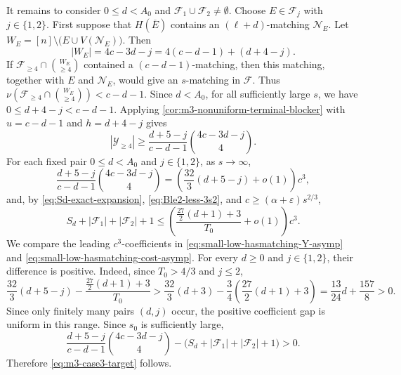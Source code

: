 \documentclass[10pt,a4paper]{article}
\numberwithin{equation}{section}
\theoremstyle{definition}
\newcommand{\F}{\mathcal F}
\newcommand{\Y}{\mathcal Y}
\begin{document}
It remains to consider $0\le d<A_0$ and $\F_1\cup\F_2\ne\emptyset$.
Choose $E\in\F_j$ with $j\in\{1,2\}$.
First suppose that $H(\overline E)$ contains an $(\ell+d)$-matching $\mathcal N_E$.
Let $W_E=[n]\setminus\bigl(E\cup V(\mathcal N_E)\bigr)$.
Then
\[
        |W_E|=4c-3d-j=4(c-d-1)+(d+4-j).
\]
If $\F_{\ge4}\cap\binom {W_E}{\ge4}$ contained a $(c-d-1)$-matching, then this matching, together with $E$ and $\mathcal N_E$, would give an $s$-matching in $\F$.
Thus $\nu\left(\F_{\ge4}\cap\binom {W_E}{\ge4}\right)<c-d-1$.
Since $d<A_0$, for all sufficiently large $s$, we have $0\le d+4-j<c-d-1$.
Applying \cref{cor:m3-nonuniform-terminal-blocker} with $u=c-d-1$ and $h=d+4-j$ gives
\[
        |\Y_{\ge4}|
        \ge
        \frac{d+5-j}{c-d-1}\binom{4c-3d-j}{4}.
\]
For each fixed pair $0\le d<A_0$ and $j\in\{1,2\}$, as $s\to\infty$,
\begin{equation}\label{eq:small-low-hasmatching-Y-asymp}
        \frac{d+5-j}{c-d-1}\binom{4c-3d-j}{4}
        =
        \left(\frac{32}{3}(d+5-j)+o(1)\right)c^3,
\end{equation}
and, by \eqref{eq:Sd-exact-expansion}, \eqref{eq:Ble2-less-3s2}, and $c\ge(\alpha+\varepsilon)s^{2/3}$,
\begin{equation}\label{eq:small-low-hasmatching-cost-asymp}
        S_d+|\F_1|+|\F_2|+1
        \le
        \left(
        \frac{\frac{27}{2}(d+1)+3}{T_0}
        +o(1)
        \right)c^3.
\end{equation}
We compare the leading $c^3$-coefficients in \eqref{eq:small-low-hasmatching-Y-asymp} and \eqref{eq:small-low-hasmatching-cost-asymp}.
For every $d\ge0$ and $j\in\{1,2\}$, their difference is positive.
Indeed, since $T_0>4/3$ and $j\le2$,
\[
        \frac{32}{3}(d+5-j)
        -\frac{\frac{27}{2}(d+1)+3}{T_0}>
        \frac{32}{3}(d+3)
        -\frac34\left(\frac{27}{2}(d+1)+3\right)=\frac{13}{24}d+\frac{157}{8}>0.
\]
Since only finitely many pairs $(d,j)$ occur, the positive coefficient gap is uniform in this range. Since $s_0$ is sufficiently large,
\[
        \frac{d+5-j}{c-d-1}\binom{4c-3d-j}{4}
        -
        \bigl(S_d+|\F_1|+|\F_2|+1\bigr)
        >0.
\]
Therefore \eqref{eq:m3-case3-target} follows.
\end{document}
